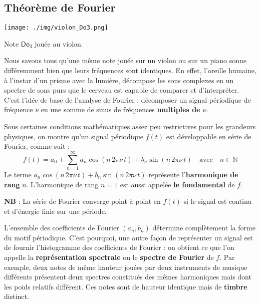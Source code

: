 \subsection{Théorème de Fourier}%
\label{sec:theoreme_de_fourier}
\begin{marginfigure}[*1]
\texttt{[image: ./img/violon\_Do3.png]}
\caption{Note \(\mathsf{Do_3}\) jouée au violon.}
\end{marginfigure}
Nous savons tous qu'une même note jouée sur un violon ou sur un piano sonne différemment bien que leurs fréquences sont identiques. En effet, l'oreille humaine, à l'instar d'un prisme avec la lumière, décompose les sons complexes en un spectre de sons purs que le cerveau est capable de comparer et d'interpréter. C'est l'idée de base de l'analyse de Fourier : décomposer un signal périodique de fréquence \(\nu\) en une somme de sinus de fréquences \textbf{multiples de \(\nu\)}. 
\begin{kaobox}[frametitle=Théorème de Fourier]
Sous certaines conditions mathématiques assez peu restrictives pour les grandeurs physiques, on montre qu'un signal périodique \(f(t)\) est développable en série de Fourier, comme suit :
\begin{equation}
f(t)=a_{0}+\sum_{n=1}^{\infty}a_{n}\cos(n\, 2\pi \nu\, t)+b_{n}\sin(n\, 2\pi \nu \, t)
\quad\text{avec}\quad
n\in \mathbb{N}
\label{serie-de-fourier-eq6}
\end{equation}
Le terme \(a_{n}\cos(n\, 2\pi \nu\, t)+b_{n}\sin(n\, 2\pi \nu \, t)\) représente l'\textbf{harmonique de rang} \(n\). L'harmonique de rang \(n=1\) est aussi appelée \textbf{le fondamental} de \(f\). 

\textbf{NB} : La série de Fourier converge point à point en \(f(t)\) si le signal est continu et d'énergie finie sur une période.
\end{kaobox}
L'ensemble des coefficients de Fourier \((a_n,b_n)\) détermine complètement la forme du motif périodique. C'est pourquoi, une autre façon de représenter un signal est de fournir l'histogramme des coefficients de Fourier : on obtient ce que l'on appelle la \textbf{représentation spectrale} ou le \textbf{spectre de Fourier} de \(f\). Par exemple, deux notes de même hauteur jouées par  deux instruments de musique différents présentent deux spectres constitués des mêmes harmoniques mais dont les poids relatifs diffèrent. Ces notes sont de hauteur identique mais de \textbf{timbre} distinct.

